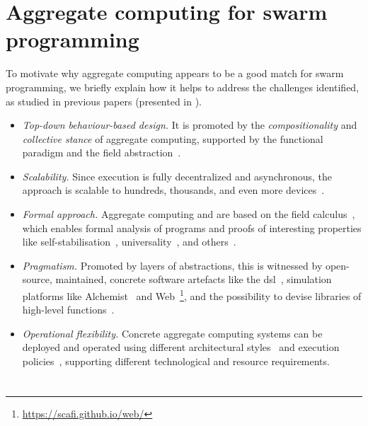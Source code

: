 \section{Aggregate computing for swarm programming}
%
To motivate why aggregate computing appears to be a good match for swarm programming, we briefly explain how it helps to address the challenges identified, as studied in previous papers (presented in ).
%
\begin{itemize}
\item \emph{Top-down behaviour-based design.} It is promoted by the \emph{compositionality} and \emph{collective stance} of aggregate computing, supported by the functional paradigm and the field abstraction~\cite{AVDPB-TOCL2019,DBLP:conf/ecoop/AudritoCDSV22}.
\item \emph{Scalability.} Since execution is fully decentralized and asynchronous, the approach is scalable to hundreds, thousands, and even more devices~\cite{DBLP:journals/eaai/CasadeiVAPD21}.
\item \emph{Formal approach.} Aggregate computing and \scafi{} are based on the field calculus~\cite{ACDV-LMCS2023,AVDPB-TOCL2019}, which enables formal analysis of programs and proofs of interesting properties like self-stabilisation~\cite{DBLP:journals/tomacs/ViroliABDP18}, universality~\cite{DBLP:conf/coordination/AudritoBDV18}, and others~\cite{DBLP:journals/jlap/ViroliBDACP19}.
\item \emph{Pragmatism.} Promoted by layers of abstractions, this is witnessed by open-source, maintained, concrete software artefacts like the \scafi{} \ac{dsl}~\cite{DBLP:journals/softx/CasadeiVAP22},  simulation platforms like Alchemist~\cite{DBLP:journals/jos/PianiniMV13} and {\sc{}\scafi{} Web}~\cite{DBLP:conf/coordination/AguzziCMPV21}\footnote{\url{https://scafi.github.io/web/}}, and the possibility to devise libraries of high-level functions~\cite{DBLP:journals/eaai/CasadeiVAPD21}.
\item \emph{Operational flexibility.} Concrete aggregate computing systems can be deployed and operated using different architectural styles~\cite{DBLP:journals/fi/CasadeiPPVW20} and execution policies~\cite{DBLP:journals/lmcs/PianiniCVMZ21}, supporting different technological and resource requirements.
\end{itemize}
%

\section{\MacroSwarm{}}
\label{coordination2023-macro:sec:contrib}

